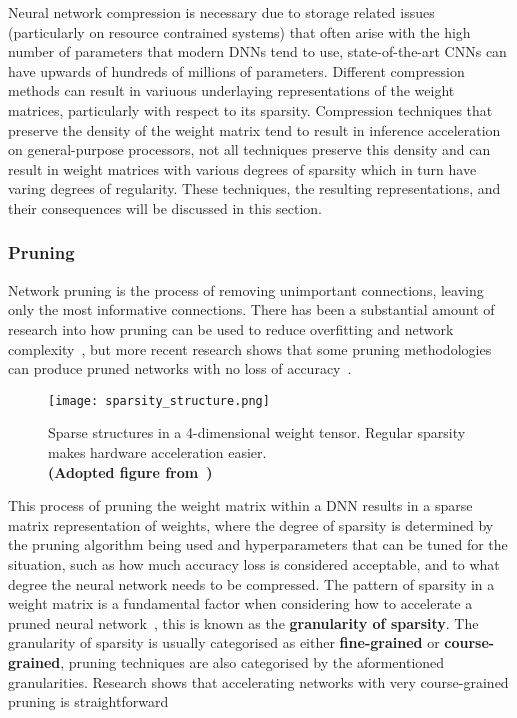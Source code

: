 \documentclass[../../D1.tex]{subfiles}
\begin{document}
Neural network compression is necessary due to storage related issues (particularly on resource contrained systems) that often arise with the high number of parameters that modern DNNs tend to use, state-of-the-art CNNs can have upwards of hundreds of millions of parameters. 
Different compression methods can result in variuous underlaying representations of the weight matrices, particularly with respect to its sparsity. 
Compression techniques that preserve the density of the weight matrix tend to result in inference acceleration on general-purpose processors\autocite{lebedevSpeedingupConvolutionalNeural2015,zhangAcceleratingVeryDeep2016}, not all techniques preserve this density and can result in weight matrices with various degrees of sparsity which in turn have varing degrees of regularity. 
These techniques, the resulting representations, and their consequences will be discussed in this section.

\subsubsection{Pruning}\label{sec:Pruning}
Network pruning is the process of removing unimportant connections, leaving only the most informative connections.
There has been a substantial amount of research into how pruning can be used to reduce overfitting and network complexity~\autocite{hansonComparingBiasesMinimal,hassibiSecondOrderDerivatives,lecunOptimalBrainDamage,stromPhonemeProbabilityEstimation1997}, but more recent research shows that some pruning methodologies can produce pruned networks with no loss of accuracy~\autocite{hanLearningBothWeights2015}.

\begin{figure}[H]
    \begin{center}
        \texttt{[image: sparsity\_structure.png]} 
    \end{center}
    
    \caption{Sparse structures in a 4-dimensional weight tensor. Regular sparsity makes hardware acceleration easier.\\ \textbf{(Adopted figure from~\autocite{maoExploringRegularitySparse2017})}}
    \label{fig:QuantizationClust}   
\end{figure}

This process of pruning the weight matrix within a DNN results in a sparse matrix representation of weights, where the degree of sparsity is determined by the pruning algorithm being used and hyperparameters that can be tuned for the situation, such as how much accuracy loss is considered acceptable, and to what degree the neural network needs to be compressed. 
The pattern of sparsity in a weight matrix is a fundamental factor when considering how to accelerate a pruned neural network~\autocite{maoExploringRegularitySparse2017}, this is known as the \textbf{granularity of sparsity}.
The granularity of sparsity is usually categorised as either \textbf{fine-grained} or \textbf{course-grained}, pruning techniques are also categorised by the aformentioned granularities.
Research shows that accelerating networks with very course-grained pruning is straightforward
\end{document}
